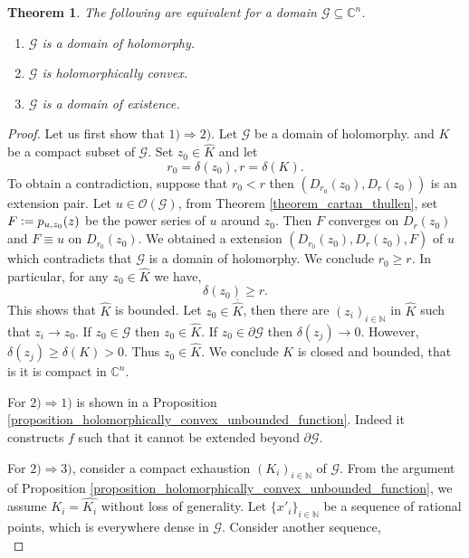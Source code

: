 \documentclass{article}
\newtheorem{theorem}{Theorem} [section]
\newcommand{\defeq}{\vcentcolon=}
\newcommand{\N}[0]{\mathbb{N}}
\newcommand{\C}[0]{\mathbb{C}}
\newcommand{\G}[0]{\mathcal{G}}
\newcommand{\bd}[0]{\partial}
\newcommand{\Ouv}[0]{\mathcal{O}}
\begin{document}
\begin{theorem}
  The following are equivalent for a domain $\G\subseteq\C^n$.
  \begin{enumerate}[1).]
    \item $\G$ is a domain of holomorphy.
    \item $\G$ is holomorphically convex.
    \item $\G$ is a domain of existence.
  \end{enumerate}
\end{theorem}

\begin{proof}
  Let us first show that $1)\Rightarrow 2)$. Let $\G$ be a domain of holomorphy. and $K$ be a compact subset of $\G$. Set $z_0\in\hat{K}$ and let
  \begin{equation*}
    r_0=\delta(z_0),r=\delta(K).
  \end{equation*}
  To obtain a contradiction, suppose that $r_0<r$ then $(D_{r_0}(z_0),D_r(z_0))$ is an extension pair. Let $u\in\Ouv(\G)$, from Theorem \ref{theorem_cartan_thullen}, set $F\defeq p_{u,z_0}(z)$ be the power series of $u$ around $z_0$. Then $F$ converges on $D_r(z_0)$ and $F\equiv u$ on $D_{r_0}(z_0)$.
  We obtained a extension $(D_{r_0}(z_0),D_{r}(z_0),F)$ of $u$ which contradicts that $\G$ is a domain of holomorphy. We conclude $r_0\geq r$. In particular, for any $z_0\in\hat{K}$ we have,
  \begin{equation*}
    \delta(z_0)\geq r.
  \end{equation*}
  This shows that $\hat{K}$ is bounded. Let $z_0\in\overline{\hat{K}}$, then there are $(z_i)_{i\in\N}$ in $\hat{K}$ such that $z_i\to z_0$. If $z_0\in\G$ then $z_0\in\hat{K}$.
  If $z_0\in\bd\G$ then $\delta(z_j)\to 0$. However, $\delta(z_j)\geq\delta(K)>0$. Thus $z_0\in \hat{K}$. We conclude $K$ is closed and bounded, that is it is compact in $\C^n$.
  \par For $2)\Rightarrow 1)$ is shown in a Proposition \ref{proposition_holomorphically_convex_unbounded_function}. Indeed it constructs $f$ such that it cannot be extended beyond $\bd\G$.
  \par For $2)\Rightarrow 3)$, consider a compact exhaustion $(K_i)_{i\in\N}$ of $\G$. From the argument of Proposition \ref{proposition_holomorphically_convex_unbounded_function}, we assume $K_i = \hat{K_i}$ without loss of generality. Let $\{x'_i\}_{i\in \N}$ be a sequence of rational points, which is everywhere dense in $\G$.
  Consider another sequence,
  \begin{equation*}

\end{equation*}
\end{proof}
\end{document}
